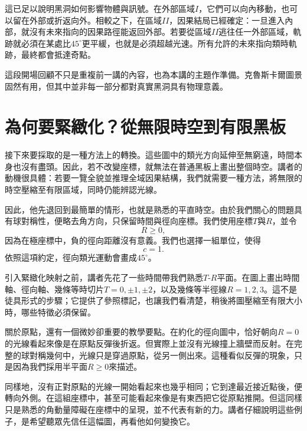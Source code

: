這已足以說明黑洞如何影響物體與訊號。在外部區域\(I\)，它們可以向內移動，也可以留在外部或折返向外。相較之下，在區域\(II\)，因果結局已經確定：一旦進入內部，就沒有未來指向的因果路徑能返回外部。若要從區域\(II\)逃往任一外部區域，軌跡就必須在某處比\(45^\circ\)更平緩，也就是必須超越光速。所有允許的未來指向類時軌跡，最終都會抵達奇點。

這段開場回顧不只是重複前一講的內容，也為本講的主題作準備。克魯斯卡爾圖景固然有用，但其中並非每一部分都對真實黑洞具有物理意義。

\begin{classroomqa}
\end{classroomqa}

\section{為何要緊緻化？從無限時空到有限黑板}

接下來要採取的是一種方法上的轉換。這些圖中的類光方向延伸至無窮遠，時間本身也沒有盡頭。因此，若不改變座標，就無法在普通黑板上畫出整個時空。講者的動機很具體：若要一覽全貌並推理全域因果結構，我們就需要一種方法，將無限的時空壓縮至有限區域，同時仍能辨認光線。

因此，他先退回到最簡單的情形，也就是熟悉的平直時空。由於我們關心的問題具有球對稱性，便略去角方向，只保留時間與徑向座標。我們使用座標\(T\)與\(R\)，並令
\[
R\ge 0,
\]
因為在極座標中，負的徑向距離沒有意義。我們也選擇一組單位，使得
\[
c=1.
\]
依照這項約定，徑向類光運動會畫成\(45^\circ\)。

引入緊緻化映射之前，講者先花了一些時間帶我們熟悉\(T\)-\(R\)平面。在圖上畫出時間軸、徑向軸、幾條等時切片\(T=0,\pm1,\pm2\)，以及幾條等半徑線\(R=1,2,3\)。這不是徒具形式的步驟；它提供了參照標記，也讓我們看清楚，稍後將圖壓縮至有限大小時，哪些特徵必須保留。

關於原點，還有一個微妙卻重要的教學要點。在約化的徑向圖中，恰好朝向\(R=0\)的光線看起來像是在原點反彈後折返。但實際上並沒有光線撞上牆壁而反射。在完整的球對稱幾何中，光線只是穿過原點，從另一側出來。這種看似反彈的現象，只是因為我們採用半平面\(R\ge 0\)來描述。

同樣地，沒有正對原點的光線一開始看起來也幾乎相同；它到達最近接近點後，便轉向外側。在這組座標中，甚至可能看起來像是有東西把它從原點推開。但這同樣只是熟悉的角動量障礙在座標中的呈現，並不代表有新的力。講者仔細說明這些例子，是希望聽眾先信任這幅圖，再看他如何變換它。

